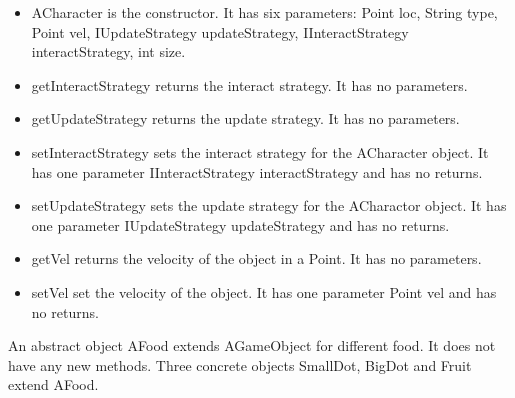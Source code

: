 \documentclass[letterpaper, 11pt]{article}
\begin{document}
\begin{itemize}
\item ACharacter is the constructor. It has six parameters: Point loc, String type, Point vel, IUpdateStrategy updateStrategy, IInteractStrategy interactStrategy, int size.
\item getInteractStrategy returns the interact strategy. It has no parameters.
\item getUpdateStrategy returns the update strategy. It has no parameters.
\item setInteractStrategy sets the interact strategy for the ACharacter object. It has one parameter IInteractStrategy interactStrategy and has no returns. 
\item setUpdateStrategy sets the update strategy for the ACharactor object. It has one parameter IUpdateStrategy updateStrategy and has no returns. 
\item getVel returns the velocity of the object in a Point. It has no parameters. 
\item setVel set the velocity of the object. It has one parameter Point vel and has no returns. 
\end{itemize}

An abstract object AFood extends AGameObject for different food. It does not have any new methods. Three concrete objects SmallDot, BigDot and Fruit extend AFood. 
\end{document}
